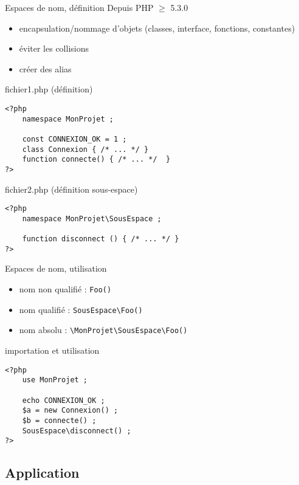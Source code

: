 \begin{frame}[containsverbatim]{Espaces de nom, définition}
Depuis PHP $\ge$ 5.3.0
\begin{itemize}
\item encapsulation/nommage d'objets (classes, interface, fonctions, constantes)
\item éviter les collisions
\item créer des alias
\end{itemize}
\begin{block}{fichier1.php (définition)}
\begin{lstlisting}
<?php
	namespace MonProjet ;
	
	const CONNEXION_OK = 1 ;
	class Connexion { /* ... */ }
	function connecte() { /* ... */  }
?>
\end{lstlisting}
\end{block}
\begin{block}{fichier2.php (définition sous-espace)}
\begin{lstlisting}
<?php
	namespace MonProjet\SousEspace ;

	function disconnect () { /* ... */ }
?>
\end{lstlisting}
\end{block}
\end{frame}

\begin{frame}[containsverbatim]{Espaces de nom, utilisation}
\begin{itemize}
\item nom non qualifié : \texttt{Foo()}
\item nom qualifié : \texttt{SousEspace\textbackslash{}Foo()}
\item nom absolu : \texttt{\textbackslash{}MonProjet\textbackslash{}SousEspace\textbackslash{}Foo()}
\end{itemize}
\begin{block}{importation et utilisation}
\begin{lstlisting}
<?php
	use MonProjet ;
	
	echo CONNEXION_OK ;
	$a = new Connexion() ;
	$b = connecte() ;
	SousEspace\disconnect() ;
?>
\end{lstlisting}
\end{block}
\end{frame}


\subsection{Application}

